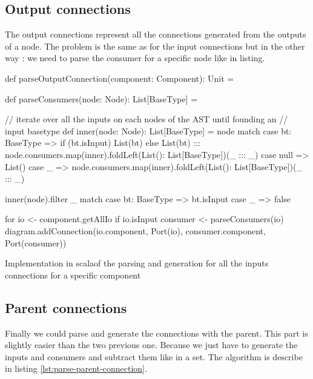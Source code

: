 \subsection{Output connections}
\label{sec:output-connections}

The output connections represent all the connections generated from the outputs
of a node. The problem is the same as for the input connections but in the other
way : we need to parse the consumer for a specific node like in listing.

\begin{listing}[H]
  \centering
  \begin{scalacode}
  def parseOutputConnection(component: Component): Unit = {
      
    def parseConsumers(node: Node): List[BaseType] = {
      
      // iterate over all the inputs on each nodes of the AST until founding an
      // input basetype
      def inner(node: Node): List[BaseType] = node match {
        case bt: BaseType =>
          if (bt.isInput) List(bt)
          else List(bt) ::: node.consumers.map(inner).foldLeft(List(): List[BaseType])(_ ::: _)
        case null => List()
        case _ => node.consumers.map(inner).foldLeft(List(): List[BaseType])(_ ::: _)
      }

      inner(node).filter {
        _ match {
          case bt: BaseType => bt.isInput
          case _ => false
        }
      }
    }

    for {
      io <- component.getAllIo
      if io.isInput
      consumer <- parseConsumers(io)
    } {
      diagram.addConnection(io.component, Port(io), consumer.component, Port(consumer))
    }
  }
  \end{scalacode}
  \caption[Parsing and generation of the outputs connections]{Implementation in
    scalaof the parsing and generation for all the inputs connections for a
    specific component}
  \label{lst:parse-output-connection-scala}
\end{listing}

\subsection{Parent connections}
\label{sec:parent-connections}

Finally we could parse and generate the connections with the parent. This part
is slightly easier than the two previous one. Because we just have to generate
the inputs and consumers and subtract them like in a set. The algorithm is
describe in listing \ref{lst:parse-parent-connection}.

